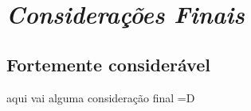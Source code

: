 \chapter{\textit{Considerações Finais}}
	\label{ch:consideracoes}

\section{Fortemente considerável}
aqui vai alguma consideração final =D